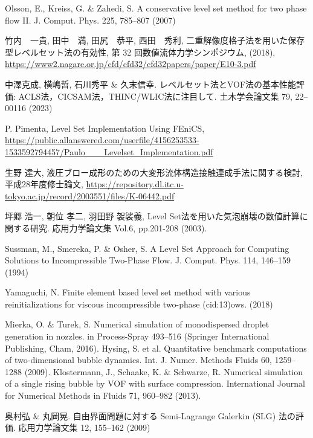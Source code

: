 \documentclass[8pt,a4paper]{article}
\begin{document}
\begin{thebibliography}{99}
	 Olsson, E., Kreiss, G. \& Zahedi, S. A conservative level set method for two phase flow II. J. Comput. Phys. 225, 785–807 (2007)

	 竹内　一貴, 田中　満, 田尻　恭平, 西田　秀利, 二重解像度格子法を用いた保存型レベルセット法の有効性, 第 32 回数値流体力学シンポジウム, (2018), \url{https://www2.nagare.or.jp/cfd/cfd32/cfd32papers/paper/E10-3.pdf}

	 中澤克成, 横嶋哲, 石川秀平 \& 久末信幸. レベルセット法とVOF法の基本性能評価: ACLS法，CICSAM法，THINC/WLIC法に注目して. 土木学会論文集 79, 22–00116 (2023)

	 P. Pimenta, Level Set Implementation Using FEniCS, \url{https://public.allanswered.com/userfile/4156253533-1533592794457/Paulo___Levelset_Implementation.pdf}

	 生野 達大, 液圧ブロー成形のための大変形流体構造接触連成手法に関する検討, 平成28年度修士論文, \url{https://repository.dl.itc.u-tokyo.ac.jp/record/2003551/files/K-06442.pdf}

	 坪郷 浩一, 朝位 孝二, 羽田野 袈裟義, Level Set法を用いた気泡崩壊の数値計算に関する研究. 応用力学論文集 Vol.6, pp.201-208 (2003).
	
	 Sussman, M., Smereka, P. \& Osher, S. A Level Set Approach for Computing Solutions to Incompressible Two-Phase Flow. J. Comput. Phys. 114, 146–159 (1994)

	 Yamaguchi, N. Finite element based level set method with various reinitializations for viscous incompressible two-phase (cid:13)ows. (2018)

	 Mierka, O. \& Turek, S. Numerical simulation of monodispersed droplet generation in nozzles. in Process-Spray 493–516 (Springer International Publishing, Cham, 2016).
	 Hysing, S. et al. Quantitative benchmark computations of two‐dimensional bubble dynamics. Int. J. Numer. Methods Fluids 60, 1259–1288 (2009).
	 Klostermann, J., Schaake, K. \& Schwarze, R. Numerical simulation of a single rising bubble by VOF with surface compression. International Journal for Numerical Methods in Fluids 71, 960–982 (2013).

	 奥村弘 \& 丸岡晃. 自由界面問題に対する Semi-Lagrange Galerkin (SLG) 法の評価. 応用力学論文集 12, 155–162 (2009)


\end{thebibliography}
\end{document}
